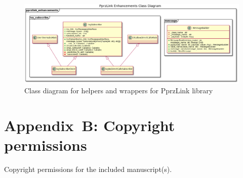 \begin{landscape}
\begin{figure}
    \centering
    \includegraphics[width=.7\paperheight]{UML/pprzlink_enhancements_CD.png}
    \caption{Class diagram for helpers and wrappers for PprzLink library}
    \label{fig:pprzlink_enhancements_class_diagram}
\end{figure}
\end{landscape}

\chapter{Appendix~B: Copyright permissions}\label{appendixb}
Copyright permissions for the included manuscript(s).

